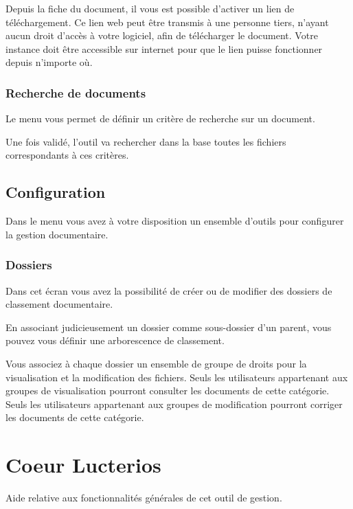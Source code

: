\documentclass[letterpaper,10pt,french]{sphinxmanual}
\begin{document}
Depuis la fiche du document, il vous est possible d’activer un lien de téléchargement.
Ce lien web peut être transmis à une personne tiers, n’ayant aucun droit d’accès à votre logiciel, afin de télécharger le document.
 Votre instance doit être accessible sur internet pour que le lien puisse fonctionner depuis n’importe où.


\subsection{Recherche de documents}
\label{\detokenize{documents/shared_document:recherche-de-documents}}
Le menu  vous permet de définir un critère de recherche sur un document.

Une fois validé, l’outil va rechercher dans la base toutes les fichiers correspondants à ces critères.


\section{Configuration}
\label{\detokenize{documents/configuration:configuration}}\label{\detokenize{documents/configuration::doc}}
Dans le menu  vous avez à votre disposition un ensemble d’outils pour configurer la gestion documentaire.


\subsection{Dossiers}
\label{\detokenize{documents/configuration:dossiers}}
Dans cet écran vous avez la possibilité de créer ou de modifier des dossiers de classement documentaire.

\noindent{}

En associant judicieusement un dossier comme sous-dossier d’un parent, vous pouvez vous définir une arborescence de classement.

Vous associez à chaque dossier un ensemble de groupe de droits pour la visualisation et la modification des fichiers. Seuls les utilisateurs appartenant aux groupes de visualisation pourront consulter les documents de cette catégorie. Seuls les utilisateurs appartenant aux groupes de modification pourront corriger les documents de cette catégorie.


\chapter{Coeur Lucterios}
\label{\detokenize{CORE/index:coeur-lucterios}}\label{\detokenize{CORE/index::doc}}
Aide relative aux fonctionnalités générales de cet outil de gestion.
\end{document}
